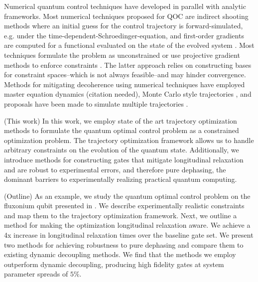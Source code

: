 \documentclass[
  amsfonts,
  amsmath,
  tbtags,
  amssymb,
  aps,
  nobibnotes,
  twocolumn,
]{revtex4-2}
\begin{document}
Numerical quantum control techniques have developed in parallel
with analytic frameworks.
Most numerical techniques proposed for QOC are indirect shooting
methods where an initial guess for the control trajectory is forward-simulated,
e.g. under the time-dependent-Schroedinger-equation,
and first-order gradients are computed for a functional evaluated
on the state of the evolved system \cite{leung2017speedup,  goerz2019krotov, doria2011optimal,
  abdelhafez2019gradient, machnes2015gradient, leng2019robust}.
Most techniques formulate the
problem as unconstrained or use
projective gradient methods to enforce constraints
\cite{machnes2015gradient}.
The latter approach relies on constructing
bases for constraint spaces--which is not always feasible--and
may hinder convergence. Methods for mitigating decoherence using numerical
techniques have employed master equation dynamics (citation needed),
Monte Carlo style trajectories \cite{abdelhafez2019gradient},
and proposals have been made to simulate multiple trajectories
\cite{reinhold2019controlling, rembold2020introduction}.

(This work) In this work, we employ state of the art
trajectory optimization methods
to formulate the quantum
optimal control problem as a constrained optimization problem.
The trajectory optimization framework allows us to handle arbitrary
constraints on the evolution of the quantum state. Additionally,
we introduce methods for constructing gates that mitigate longitudinal
relaxation and are robust to experimental errors, and therefore
pure dephasing, the dominant barriers to experimentally
realizing practical quantum computing.

(Outline) As an example, we study the quantum optimal control problem on
the fluxonium qubit presented in \cite{zhang2020universal}.
We describe experimentally realistic constraints and map them to
the trajectory optimization framework. Next, we
outline a method for making the optimization longitudinal
relaxation aware. We achieve a 4x increase in longitudinal relaxation times
over the baseline gate set.
We present two methods for achieving robustness to pure dephasing
and compare them to existing dynamic decoupling methods. We find that
the methods we employ outperform dynamic decoupling, producing
high fidelity gates at system parameter spreads of $5\%$.


\end{document}
